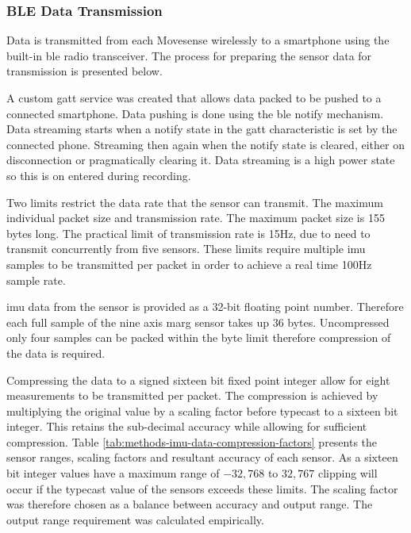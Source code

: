 \subsubsection{BLE Data Transmission} %
\label{subsection:methods-on-sensor-compression}
Data is transmitted from each Movesense wirelessly to a smartphone using the built-in \acrfull{ble} radio transceiver. The process for preparing the sensor data for transmission is presented below.

A custom \acrfull{gatt} service was created that allows data packed to be pushed to a connected smartphone. Data pushing is done using the \acrshort{ble} notify mechanism. Data streaming starts when a notify state in the \acrshort{gatt} characteristic is set by the connected phone. Streaming then again when the notify state is cleared, either on disconnection or pragmatically clearing it. Data streaming is a high power state so this is on entered during recording.

Two limits restrict the data rate that the sensor can transmit. The maximum individual packet size and transmission rate. The maximum packet size is 155 bytes long. The practical limit of transmission rate is 15Hz, due to need to transmit concurrently from five sensors. These limits require multiple \acrshort{imu} samples to be transmitted per packet in order to achieve a real time 100Hz sample rate.

\acrshort{imu} data from the sensor is provided as a 32-bit floating point number. Therefore each full sample of the nine axis \acrshort{marg} sensor takes up 36 bytes. Uncompressed only four samples can be packed within the byte limit therefore compression of the data is required.

Compressing the data to a signed sixteen bit fixed point integer allow for eight measurements to be transmitted per packet. The compression is achieved by multiplying the original value by a scaling factor before typecast to a sixteen bit integer. This retains the sub-decimal accuracy while allowing for sufficient compression. Table \ref{tab:methods-imu-data-compression-factors} presents the sensor ranges, scaling factors and resultant accuracy of each sensor. As a sixteen bit integer values have a maximum range of $-32,768$ to $32,767$ clipping will occur if the typecast value of the sensors exceeds these limits. The scaling factor was therefore chosen as a balance between accuracy and output range. The output range requirement was calculated empirically.

